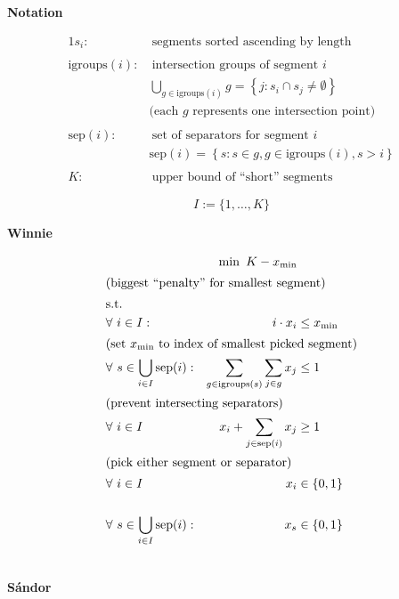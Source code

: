\documentclass{minimal}
\newcommand{\igroups}{\text{igroups}}
\newcommand{\sep}{\text{sep}}
\begin{document}
	\textbf{Notation}
	
	\begin{alignat*}{1}
		s_i: &~\text{segments sorted ascending by length} \\\\
		\igroups(i): &~\text{intersection groups of segment \(i\)} \\
		& \bigcup\limits_{g\in\igroups(i)} g = \left\{ j : s_i\cap s_j\neq\emptyset \right\}  \\
		& \text{(each \(g\) represents one intersection point)} \\\\
		\sep(i): &~\text{set of separators for segment \(i\)} \\
		& \sep(i) = \left\{ s : s\in g, g\in\igroups(i), s>i \right\}  \\\\
		K: &~\text{upper bound of ``short'' segments}
	\end{alignat*}
	
	\[I := \{1,\ldots,K\} \]

	\textbf{Winnie}
	
	\begin{alignat*}{2}
		&& \min~ K-x_{\min} \\
		\intertext{\centering (biggest ``penalty'' for smallest segment)}
		&\text{s.t.} \\
		&\forall~i\in I:
			&~ i\cdot x_i &\leq x_{\min} \\
		\intertext{\centering (set \(x_{\min}\) to index of smallest picked segment)}
		&\forall~s\in\bigcup\limits_{i\in I} \sep(i):
			& \sum\limits_{g\in\igroups(s)}\sum\limits_{j\in g} x_j &\leq 1 \\
		\intertext{\centering (prevent intersecting separators)}
		&\forall~i\in I
			& x_i + \sum\limits_{j\in\sep(i)} x_j &\geq 1 \\
		\intertext{\centering (pick either segment or separator)}
		&\forall~i\in I
			& x_i &\in \{0,1\} \\\\
		&\forall~s\in\bigcup\limits_{i\in I} \sep(i):
			& x_s &\in \{0,1\} \\\\
	\end{alignat*}\pagebreak

	\textbf{Sándor}
	
\end{document}
